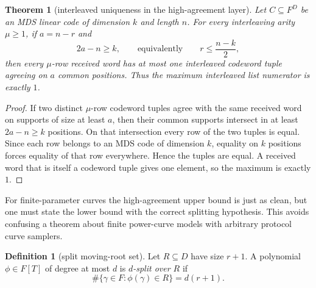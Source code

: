 \documentclass[11pt]{article}
\newtheorem{theorem}{Theorem}[section]
\theoremstyle{definition}
\newtheorem{definition}[definition]{Definition}
\begin{document}
\begin{theorem}[interleaved uniqueness in the high-agreement layer]\label{thm:B-interleaved-unique-high-agreement}
Let \(C\subseteq F^D\) be an MDS linear code of dimension \(k\) and length
\(n\).  For every interleaving arity \(\mu\ge1\), if \(a=n-r\) and
\[
        2a-n\ge k,
        \qquad\text{equivalently}\qquad
        r\le \frac{n-k}{2},
\]
then every \(\mu\)-row received word has at most one interleaved codeword tuple
agreeing on \(a\) common positions.  Thus the maximum interleaved list numerator
is exactly \(1\).
\end{theorem}

\begin{proof}
If two distinct \(\mu\)-row codeword tuples agree with the same received word on
supports of size at least \(a\), then their common supports intersect in at least
\(2a-n\ge k\) positions.  On that intersection every row of the two tuples is
equal.  Since each row belongs to an MDS code of dimension \(k\), equality on
\(k\) positions forces equality of that row everywhere.  Hence the tuples are
equal.  A received word that is itself a codeword tuple gives one element, so the
maximum is exactly \(1\).
\end{proof}

For finite-parameter curves the high-agreement upper bound is just as clean, but
one must state the lower bound with the correct splitting hypothesis.  This
avoids confusing a theorem about finite power-curve models with arbitrary
protocol curve samplers.

\begin{definition}[split moving-root set]\label{def:B-split-moving-root}
Let \(R\subseteq D\) have size \(r+1\).  A polynomial \(\phi\in F[T]\) of degree
at most \(d\) is \emph{\(d\)-split over \(R\)} if
\[
        \#\{\gamma\in F:\phi(\gamma)\in R\}=d(r+1).
\]
\end{definition}
\end{document}
